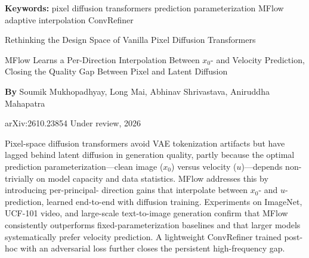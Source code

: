 \documentclass[10pt,twocolumn]{article}
\begin{document}
\setlength{\parindent}{0pt}
\setlength{\parskip}{4pt}

{\small\color{keywordgray}\textbf{Keywords:}
  pixel diffusion transformers \textbullet{}
  prediction parameterization \textbullet{}
  MFlow adaptive interpolation \textbullet{}
  ConvRefiner}\par\vspace{4pt}

{\LARGE\bfseries\raggedright
  Rethinking the Design Space of Vanilla Pixel
  Diffusion Transformers}\par\vspace{4pt}

{\large\itshape\raggedright
  MFlow Learns a Per-Direction Interpolation Between $x_0$- and
  Velocity Prediction, Closing the Quality Gap Between Pixel
  and Latent Diffusion}\par\vspace{6pt}

{\small\textbf{By} Soumik Mukhopadhyay, Long Mai,
  Abhinav Shrivastava, Aniruddha Mahapatra}\par\vspace{2pt}

{\small\color{keywordgray}arXiv:2610.23854 \textbullet{}
  Under review, 2026}
\par\vspace{2pt}\noindent{\color{rulered}\rule{\columnwidth}{0.6pt}}\vspace{6pt}

Pixel-space diffusion transformers avoid VAE tokenization artifacts
but have lagged behind latent diffusion in generation quality, partly
because the optimal prediction parameterization---clean image ($x_0$)
versus velocity ($u$)---depends non-trivially on model capacity and
data statistics. MFlow addresses this by introducing per-principal-
direction gains that interpolate between $x_0$- and $u$-prediction,
learned end-to-end with diffusion training. Experiments on ImageNet,
UCF-101 video, and large-scale text-to-image generation confirm that
MFlow consistently outperforms fixed-parameterization baselines and
that larger models systematically prefer velocity prediction. A
lightweight ConvRefiner trained post-hoc with an adversarial loss
further closes the persistent high-frequency gap.
\end{document}
